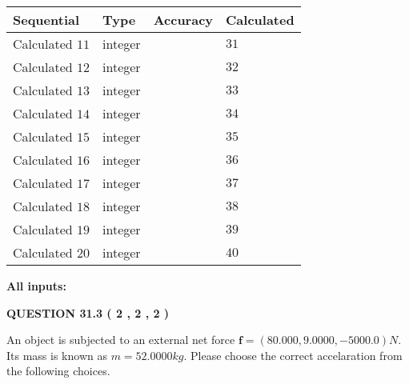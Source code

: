 \documentclass[12pt]{article}
\begin{document}
  
\noindent\begin{tabular}{|l|l|l|l|}
\hline
 Sequential & Type & Accuracy & Calculated \\ 
\hline
 
 
  Calculated $           11 $ & integer &  & 
  $ 31 $ 
 \\  \hline  
 
 
  Calculated $           12 $ & integer &  & 
  $ 32 $ 
 \\  \hline  
 
 
  Calculated $           13 $ & integer &  & 
  $ 33 $ 
 \\  \hline  
 
 
  Calculated $           14 $ & integer &  & 
  $ 34 $ 
 \\  \hline  
 
 
  Calculated $           15 $ & integer &  & 
  $ 35 $ 
 \\  \hline  
 
 
  Calculated $           16 $ & integer &  & 
  $ 36 $ 
 \\  \hline  
 
 
  Calculated $           17 $ & integer &  & 
  $ 37 $ 
 \\  \hline  
 
 
  Calculated $           18 $ & integer &  & 
  $ 38 $ 
 \\  \hline  
 
 
  Calculated $           19 $ & integer &  & 
  $ 39 $ 
 \\  \hline  
 
 
  Calculated $           20 $ & integer &  & 
  $ 40 $ 
 \\  \hline  
 \end{tabular}
   
   
   
   
\noindent\vspace{0.1in}\hspace{-0.08in} {\textbf{\Large{All inputs: }}}
   
   
  
\vspace{0.2in}
  
{\textbf{\Large{QUESTION
31.3 
 (           2 ,           2 ,           2 )
}}}
  
  
 
An object is subjected to an external net force $\mathbf{f}=(
80.000 ,
9.0000,
-5000.0  )N$. Its mass is known as
$m= %
52.0000  kg$. Please choose the correct accelaration
from the following choices.
 
\end{document}
